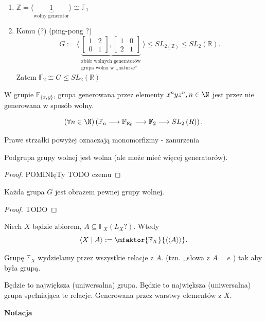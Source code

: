 \begin{enumerate}[label=\arabic*)]
	\item $\mathbb{Z} = \langle \underbrace{1}_{\text{wolny generator}} \rangle \cong \mathbb{F}_{1}$
	\item Komu (?) (ping-pong ?)
		\[
		G := \langle \underbrace{\begin{bmatrix} 1 & 2 \\ 0 & 1 \end{bmatrix} , \begin{bmatrix} 1 & 0 \\ 2 & 1 \end{bmatrix} }_{\substack{\text{zbiór wolnych generatorów} \\ \text{grupa wolna w ,,naturze''}}} \rangle \le SL_{2\left( \mathbb{Z}  \right) } \le SL_{2}\left( \mathbb{R}  \right) 
		.\] 
		Zatem $\mathbb{F}_{2} \cong  G \le SL_{2}\left( \mathbb{R}  \right) $
\end{enumerate}
\begin{theorem}
	W grupie $\mathbb{F}_{\{x,y\} }$, grupa generowana przez elementy $x^{n}yz^{n}, n\in \N$ jest przez nie generowana w sposób wolny.
\end{theorem} 
\begin{corollary}

	\[
		\left(\forall n\in \N \right)\left( \mathbb{F}_{n}\longrightarrow \mathbb{F}_{\aleph_0}\longrightarrow \mathbb{F}_{2} \longrightarrow SL_{2}\left( R \right)   \right)  
	.\] 

	Prawe strzałki powyżej oznaczają monomorfizmy - zanurzenia
\end{corollary}

\begin{theorem}
	Podgrupa grupy wolnej jest wolna (ale może mieć więcej generatorów).
\end{theorem} 
\begin{proof}
	POMINIęTy TODO czemu
\end{proof} 
\begin{fact}

	Każda grupa $G$ jest obrazem pewnej grupy wolnej.
\end{fact}
\begin{proof}
	TODO
\end{proof} 
\begin{definition}
	Niech $X$ będzie zbiorem, $A \subseteq \mathbb{F}_{X} (L_{X}?)$. Wtedy
	\[
	\langle X\mid A \rangle := \mfaktor{\mathbb{F}_{X}}{\langle \langle A \rangle  \rangle } 
	.\] 
\end{definition} 
\begin{intuition}
	Grupę $\mathbb{F}_{X}$ wydzielamy przez wszystkie relacje z $A$. (tzn. ,,słowa z $A = e$ ) tak aby była grupą.

	Będzie to największa (uniwersalna) grupa. Będzie to największa (uniwersalna) grupa spełniająca te relacje. Generowana przez warstwy elementów z $X$. 
\end{intuition} 
\noindent \textbf{Notacja} 

